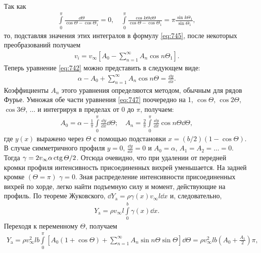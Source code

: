 	Так как
	\begin{gather*}
		\int\limits_0^\pi\frac{\dd\varTheta}{\cos\varTheta-\cos\varTheta_1} = 0,\quad
		\int\limits_0^\pi\frac{\cos k\varTheta\dd\varTheta}{\cos\varTheta-\cos\varTheta_1} = \pi\frac{\sin k\varTheta_1}{\sin\varTheta_1},
	\end{gather*}
	то, подставляя значения этих интегралов в формулу \eqref{eq:745}, после некоторых преобразований получаем
	\begin{gather}\label{eq:746}
		v_i = v_\infty\left[A_0-\sum_{n=1}^{\infty}A_n\cos n\varTheta_1\right].
	\end{gather}\n
	Теперь уравнение \eqref{eq:742} можно представить в следующем виде:
	\begin{gather}\label{eq:747}
		\alpha-A_0+\sum_{n=1}^{\infty}A_n\cos n\varTheta=\frac{\dd y}{\dd x}.
	\end{gather}
	Коэффициенты $A_n$ этого уравнения определяются методом, обычным для рядов Фурье. Умножая обе части уравнения \eqref{eq:747} поочередно на 1, $\cos\varTheta$, $\cos 2\varTheta$, $\cos 3\varTheta$, $\dots$ и интегрируя в пределах от 0 до $\pi$, получаем:
	\begin{gather}\label{eq:748}
		A_0=\alpha-\frac{1}{\pi}\int\limits_0^\pi\frac{\dd y}{\dd x}\dd\varTheta;\quad
		A_n=\frac{2}{\pi}\int\limits_0^\pi\frac{\dd y}{\dd x}\cos n\varTheta\dd\varTheta,
	\end{gather}
	где $y\left(x\right)$ выражено через $\varTheta$ с помощью подстановки $x=\left(b/2\right)\left(1-\cos\varTheta\right)$.\n
	В случае симметричного профиля $y=0$, $\frac{\dd y}{\dd x}=0$ и $A_0=\alpha$, $A_1=A_2=\dots=0$. Тогда $\gamma=2v_\infty\alpha\operatorname{ctg}\varTheta/2$. Отсюда очевидно, что при удалении от передней кромки профиля интенсивность присоединенных вихрей уменьшается. На задней кромке $\left(\varTheta=\pi\right)$ $\gamma=0$.\n
	Зная распределение интенсивности присоединенных вихрей по хорде, легко найти подъемную силу и момент, действующие на профиль. По теореме Жуковского, $\dd Y_\mathrm{a}=\rho\gamma\left(x\right)v_\infty l\dd x$ и, следовательно,
	\begin{gather*}
		Y_\mathrm{a}=\rho v_\infty l\int\limits_0^b\gamma\left(x\right)\dd x.
	\end{gather*}\n
	Переходя к переменному $\varTheta$, получаем
	\begin{gather*}
		Y_\mathrm{a}=\rho v_\infty^2 lb\int\limits_0^\pi\left[A_0\left(1+\cos\varTheta\right)+\sum_{n=1}^{\infty}A_n\sin n\varTheta\sin\varTheta\right]\dd\varTheta = \rho v_\infty^2 lb\left(A_0+\frac{A_1}{2}\right)\pi,
	\end{gather*}
